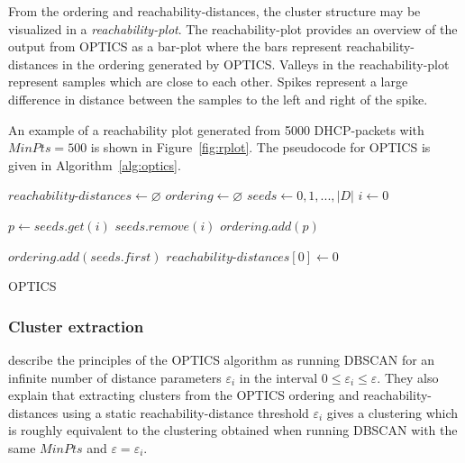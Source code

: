 \documentclass[a4paper]{report}
\begin{document}
From the ordering and reachability-distances, the cluster structure may be
visualized in a \emph{reachability-plot}. The reachability-plot provides an
overview of the output from OPTICS as a bar-plot where the bars represent
reachability-distances in the ordering generated by OPTICS. Valleys in the
reachability-plot represent samples which are close to each other. Spikes
represent a large difference in distance between the samples to the left and
right of the spike.

An example of a reachability plot generated from 5000 DHCP-packets with
$MinPts = 500$ is shown in Figure~\ref{fig:rplot}. The pseudocode for OPTICS
is given in Algorithm~\ref{alg:optics}.
\\
{
    \fontsize{10}{12}
    \selectfont
    \begin{algorithm}[H]
        \DontPrintSemicolon
        \BlankLine
        \BlankLine

        $reachability$-$distances \gets \varnothing$\;
        $ordering \gets \varnothing$\;
        $seeds \gets 0,1,...,|D|$\;
        $i \gets 0$\;

         {
            $p \gets seeds.get(i)$\;
            $seeds.remove(i)$\;
            $ordering.add(p)$\;

        }
        \;
        $ordering.add(seeds.first)$\;
        $reachability$-$distances[0] \gets 0$\;
        \BlankLine
        \caption{OPTICS}
        \label{alg:optics}
    \end{algorithm}
}

\subsubsection{Cluster extraction}

\citeauthor{ankerst99} describe the principles of the OPTICS algorithm as
running DBSCAN for an infinite number of distance parameters $\varepsilon_i$
in the interval $0 \le \varepsilon_i \le \varepsilon$. They also explain that
extracting clusters from the OPTICS ordering and reachability-distances using
a static reachability-distance threshold $\varepsilon_i$ gives a clustering
which is roughly equivalent to the clustering obtained when running DBSCAN
with the same $MinPts$ and $\varepsilon = \varepsilon_i$.
\end{document}

